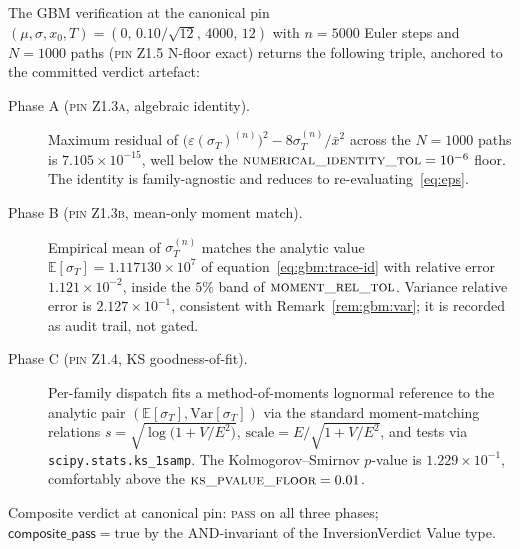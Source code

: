 \documentclass[11pt,letterpaper]{article}
\newcommand{\E}{\mathbb{E}}
\newcommand{\Var}{\text{Var}}
\newcommand{\sigmaT}{\sigma_{T}}
\newcommand{\epsT}{\varepsilon(\sigmaT)}
\newcommand{\xbar}{\bar{x}}
\newcommand{\PinZ}[1]{\textsc{pin Z1.#1}}
\begin{document}
The GBM verification at the canonical pin
$(\mu, \sigma, x_{0}, T) = (0,\, 0.10/\sqrt{12},\, 4000,\, 12)$ with
$n = 5000$ Euler steps and $N = 1000$ paths (\PinZ{5} N-floor exact)
returns the following triple, anchored to the committed verdict
artefact:

\begin{description}
    \item[Phase A (\PinZ{3a}, algebraic identity).]
        Maximum residual of
        $\bigl(\epsT^{(n)}\bigr)^{2} - 8\sigmaT^{(n)}/\xbar^{2}$
        across the $N = 1000$ paths is $7.105\times 10^{-15}$,
        well below the $\textsc{numerical\_identity\_tol} = 10^{-6}$
        floor. The identity is family-agnostic and reduces to
        re-evaluating~\eqref{eq:eps}.
    \item[Phase B (\PinZ{3b}, mean-only moment match).]
        Empirical mean of $\sigmaT^{(n)}$ matches the analytic value
        $\E[\sigmaT] = 1.117130\times 10^{7}$ of
        equation~\eqref{eq:gbm:trace-id} with relative error
        $1.121\times 10^{-2}$, inside the $5\%$ band of
        $\textsc{moment\_rel\_tol}$. Variance relative error is
        $2.127\times 10^{-1}$, consistent with Remark~\ref{rem:gbm:var};
        it is recorded as audit trail, not gated.
    \item[Phase C (\PinZ{4}, KS goodness-of-fit).]
        Per-family dispatch fits a method-of-moments lognormal
        reference to the analytic pair $(\E[\sigmaT], \Var[\sigmaT])$
        via the standard moment-matching relations
        $s = \sqrt{\log\bigl(1 + V/E^{2}\bigr)}$,
        $\mathrm{scale} = E / \sqrt{1 + V/E^{2}}$, and tests via
        \texttt{scipy.stats.ks\_1samp}. The Kolmogorov--Smirnov
        $p$-value is $1.229\times 10^{-1}$, comfortably above the
        $\textsc{ks\_pvalue\_floor} = 0.01$.
\end{description}

Composite verdict at canonical pin: \textsc{pass} on all three phases;
$\textsf{composite\_pass} = \mathrm{true}$ by the AND-invariant of the
\textsf{InversionVerdict} Value type.
\end{document}
